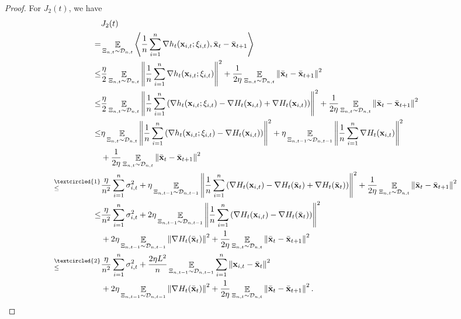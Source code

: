 \documentclass{article}
\begin{document}
\begin{proof}
For $J_2(t)$, we have
\begin{align}
\nonumber
& J_2(t) \\ \nonumber 
= & \EE_{ \Xi_{n,t} \sim \Dcal_{n,t} }\lrangle{\frac{1}{n}\sum_{i=1}^n\nabla h_t(\x_{i,t};\xi_{i,t}), \bar{\x}_t - \bar{\x}_{t+1} } \\ \nonumber
\le & \frac{\eta}{2}\EE_{ \Xi_{n,t} \sim \Dcal_{n,t} } \lrnorm{\frac{1}{n}\sum_{i=1}^n \nabla h_t(\x_{i,t};\xi_{i,t})}^2 + \frac{1}{2\eta} \EE_{ \Xi_{n,t} \sim \Dcal_{n,t} }\lrnorm{ \bar{\x}_t - \bar{\x}_{t+1}}^2  \\ \nonumber
\le & \frac{\eta}{2}\EE_{ \Xi_{n,t} \sim \Dcal_{n,t} }\lrnorm{\frac{1}{n}\sum_{i=1}^n \lrincir{\nabla  h_t(\x_{i,t};\xi_{i,t}) - \nabla H_t(\x_{i,t}) + \nabla H_t(\x_{i,t})} }^2 + \frac{1}{2\eta} \EE_{ \Xi_{n,t} \sim \Dcal_{n,t} }\lrnorm{ \bar{\x}_t - \bar{\x}_{t+1}}^2  \\ \nonumber
\le &  \eta\EE_{ \Xi_{n,t} \sim \Dcal_{n,t} }\lrnorm{\frac{1}{n}\sum_{i=1}^n \lrincir{ \nabla h_t(\x_{i,t};\xi_{i,t}) - \nabla H_t(\x_{i,t}) } }^2 + \eta \EE_{ \Xi_{n,t-1} \sim \Dcal_{n,t-1} }\lrnorm{\frac{1}{n}\sum_{i=1}^n\nabla H_t(\x_{i,t})}^2 \\ \nonumber 
& + \frac{1}{2\eta} \EE_{ \Xi_{n,t} \sim \Dcal_{n,t} }\lrnorm{ \bar{\x}_t - \bar{\x}_{t+1}}^2  \\ \nonumber
\refabovecir{\le}{\textcircled{1}} & \frac{\eta}{n^2} \sum_{i=1}^n\sigma_{i,t}^2 + \eta \EE_{ \Xi_{n,t-1} \sim \Dcal_{n,t-1} }\lrnorm{ \frac{1}{n}\sum_{i=1}^n \lrincir{ \nabla H_t(\x_{i,t}) - \nabla H_t(\bar{\x}_t) + \nabla H_t(\bar{\x}_t) } }^2 + \frac{1}{2\eta} \EE_{ \Xi_{n,t} \sim \Dcal_{n,t} }\lrnorm{ \bar{\x}_t - \bar{\x}_{t+1}}^2 \\ \nonumber
\le & \frac{\eta}{n^2} \sum_{i=1}^n\sigma_{i,t}^2 + 2\eta \EE_{ \Xi_{n,t-1} \sim \Dcal_{n,t-1} }\lrnorm{\frac{1}{n}\sum_{i=1}^n \lrincir{ \nabla H_t(\x_{i,t}) - \nabla H_t(\bar{\x}_t) } }^2 \\ \nonumber 
& + 2\eta \EE_{ \Xi_{n,t-1} \sim \Dcal_{n,t-1} }\lrnorm{\nabla H_t(\bar{\x}_t)}^2 + \frac{1}{2\eta} \EE_{ \Xi_{n,t} \sim \Dcal_{n,t} }\lrnorm{ \bar{\x}_t - \bar{\x}_{t+1}}^2 \\ \nonumber
\refabovecir{\le}{\textcircled{2}} & \frac{\eta}{n^2} \sum_{i=1}^n\sigma_{i,t}^2 + \frac{2\eta L^2}{n}\EE_{ \Xi_{n,t-1} \sim \Dcal_{n,t-1} }\sum_{i=1}^n \lrnorm{\x_{i,t} - \bar{\x}_t }^2 \\ \label{equa_j2_temp} 
& + 2\eta \EE_{ \Xi_{n,t-1} \sim \Dcal_{n,t-1} }\lrnorm{\nabla H_t(\bar{\x}_t)}^2 + \frac{1}{2\eta} \EE_{ \Xi_{n,t} \sim \Dcal_{n,t} }\lrnorm{ \bar{\x}_t - \bar{\x}_{t+1}}^2.

\end{align}
\end{proof}
\end{document}
